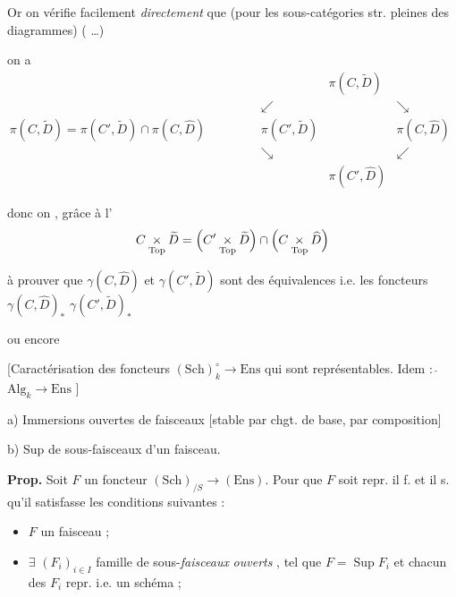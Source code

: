 \documentclass[11pt,a4paper]{article}
\begin{document}
Or on vérifie facilement \emph{directement} que (pour les sous-catégories str. pleines   des diagrammes)  ( …)

on a
\[
\pi(C, \widetilde{D}) = \pi(C', \widetilde{D}) \cap \pi(C, \widehat{D})
\qquad\qquad
\begin{array}{ccc}
& \pi(C, \widetilde{D}) & \\
\swarrow & & \searrow \\
\pi(C', \widetilde{D}) & & \pi(C, \widehat{D}) \\
\searrow & & \swarrow \\
& \pi(C', \widehat{D}) &
\end{array}
\]

donc on , grâce à l' 
\[
C \mathbin{\underset{\mathrm{Top}}{\times}} \widetilde{D} = \Bigl(C' \mathbin{\underset{\mathrm{Top}}{\times}} \widetilde{D}\Bigr) \cap \Bigl(C \mathbin{\underset{\mathrm{Top}}{\times}} \widehat{D}\Bigr)
\]

à prouver que $\gamma(C, \widehat{D})$ et $\gamma(C', \widetilde{D})$ sont des équivalences i.e.  les foncteurs $\gamma(C, \widehat{D})_*$  $\gamma(C', \widetilde{D})_*$  

ou encore


[Caractérisation des foncteurs $(\mathrm{Sch})_k^{\circ} \to \mathrm{Ens}$ qui sont représentables. \quad Idem : $\widehat{\ }$ \quad $\mathrm{Alg}_k \to \mathrm{Ens}$ \quad \ill{} ]

a) Immersions ouvertes de faisceaux [stable par chgt. de base, par composition]

b) Sup de sous-faisceaux d'un faisceau.

\textbf{Prop.} Soit $F$ un foncteur $(\mathrm{Sch})_{/S} \to (\mathrm{Ens})$. Pour que $F$ soit repr.  il f. et il s. qu'il satisfasse les conditions suivantes :

\begin{itemize}
  \item[a)] $F$ un faisceau ;
  \item[b)] $\exists$ $(F_i)_{i \in I}$ famille de sous-\emph{faisceaux} \emph{ouverts} , tel que $F = \operatorname{Sup} F_i$ \uncertain{(\ill{})} et chacun des $F_i$ repr. i.e. un schéma ;
\end{itemize}
\end{document}
